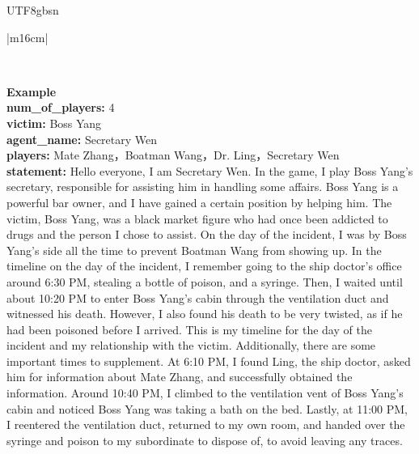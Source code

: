 \documentclass[11pt]{article}
\begin{document}
{\begin{CJK}{UTF8}{gbsn}
\begin{table}[ht!]
\begin{minipage}[t]{\linewidth}
\begin{tabular}{|m{16cm}|}
\begin{minipage}[t]{\linewidth}
\begin{verbatim}
\end{verbatim}
\end{minipage} \\
\hline
{}  \textbf{Example}  \\
 \textbf{  num\_of\_players:} \small4\\
  \textbf{  victim:} \small Boss Yang\\
 \textbf{  agent\_name:} \small Secretary Wen\\
  \textbf{  players:} \small Mate Zhang，Boatman Wang，Dr. Ling，Secretary Wen\\
  \textbf{  statement:} \small Hello everyone, I am Secretary Wen. In the game, I play Boss Yang's secretary, responsible for assisting him in handling some affairs. Boss Yang is a powerful bar owner, and I have gained a certain position by helping him. The victim, Boss Yang, was a black market figure who had once been addicted to drugs and the person I chose to assist. On the day of the incident, I was by Boss Yang's side all the time to prevent Boatman Wang from showing up. In the timeline on the day of the incident, I remember going to the ship doctor's office around 6:30 PM, stealing a bottle of poison, and a syringe. Then, I waited until about 10:20 PM to enter Boss Yang's cabin through the ventilation duct and witnessed his death. However, I also found his death to be very twisted, as if he had been poisoned before I arrived. This is my timeline for the day of the incident and my relationship with the victim. Additionally, there are some important times to supplement. At 6:10 PM, I found Ling, the ship doctor, asked him for information about Mate Zhang, and successfully obtained the information. Around 10:40 PM, I climbed to the ventilation vent of Boss Yang's cabin and noticed Boss Yang was taking a bath on the bed. Lastly, at 11:00 PM, I reentered the ventilation duct, returned to my own room, and handed over the syringe and poison to my subordinate to dispose of, to avoid leaving any traces.\\


\end{tabular}
\end{minipage}
\end{table}
\end{CJK}}
\end{document}
